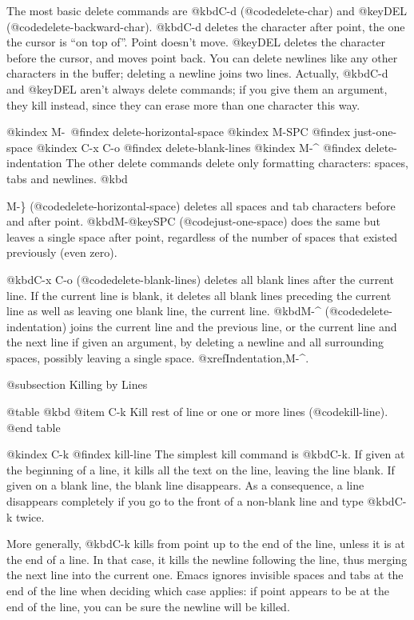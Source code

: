 {{{  The most basic delete commands are @kbd{C-d} (@code{delete-char}) and
@key{DEL} (@code{delete-backward-char}).  @kbd{C-d} deletes the
character after point, the one the cursor is ``on top of''.  Point
doesn't move.  @key{DEL} deletes the character before the cursor, and
moves point back.  You can delete newlines like any other characters in
the buffer; deleting a newline joins two lines.  Actually, @kbd{C-d} and
@key{DEL} aren't always delete commands; if you give them an argument,
they kill instead, since they can erase more than one character this
way.

@kindex M-\
@findex delete-horizontal-space
@kindex M-SPC
@findex just-one-space
@kindex C-x C-o
@findex delete-blank-lines
@kindex M-^
@findex delete-indentation
  The other delete commands delete only formatting characters: spaces,
tabs and newlines.  @kbd{M-\} (@code{delete-horizontal-space}) deletes
all spaces and tab characters before and after point.
@kbd{M-@key{SPC}} (@code{just-one-space}) does the same but leaves a
single space after point, regardless of the number of spaces that
existed previously (even zero).

  @kbd{C-x C-o} (@code{delete-blank-lines}) deletes all blank lines after
the current line. If the current line is blank, it deletes all blank lines
preceding the current line as well as leaving one blank line, the current
line.  @kbd{M-^} (@code{delete-indentation}) joins the current line and
the previous line, or the current line and the next line if given an
argument, by deleting a newline and all surrounding spaces, possibly
leaving a single space.  @xref{Indentation,M-^}.

@subsection Killing by Lines

@table @kbd
@item C-k
Kill rest of line or one or more lines (@code{kill-line}).
@end table

@kindex C-k
@findex kill-line
  The simplest kill command is @kbd{C-k}.  If given at the beginning of
a line, it kills all the text on the line, leaving the line blank.  If
given on a blank line, the blank line disappears.  As a consequence, a
line disappears completely if you go to the front of a non-blank line
and type @kbd{C-k} twice.

  More generally, @kbd{C-k} kills from point up to the end of the line,
unless it is at the end of a line.  In that case, it kills the newline
following the line, thus merging the next line into the current one.
Emacs ignores invisible spaces and tabs at the end of the line when deciding
which case applies: if point appears to be at the end of the line, you
can be sure the newline will be killed.

}}}}
